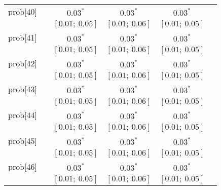 \begin{table}
\begin{center}
\begin{tabular}{l c c c c c }
prob[40]    &                                  & $0.03^{*}$                & $0.03^{*}$                & $0.03^{*}$              &                         \\
            &                                  & $[0.01;\ 0.05]$           & $[0.01;\ 0.06]$           & $[0.01;\ 0.05]$         &                         \\
prob[41]    &                                  & $0.03^{*}$                & $0.03^{*}$                & $0.03^{*}$              &                         \\
            &                                  & $[0.01;\ 0.05]$           & $[0.01;\ 0.06]$           & $[0.01;\ 0.05]$         &                         \\
prob[42]    &                                  & $0.03^{*}$                & $0.03^{*}$                & $0.03^{*}$              &                         \\
            &                                  & $[0.01;\ 0.05]$           & $[0.01;\ 0.06]$           & $[0.01;\ 0.05]$         &                         \\
prob[43]    &                                  & $0.03^{*}$                & $0.03^{*}$                & $0.03^{*}$              &                         \\
            &                                  & $[0.01;\ 0.05]$           & $[0.01;\ 0.06]$           & $[0.01;\ 0.05]$         &                         \\
prob[44]    &                                  & $0.03^{*}$                & $0.03^{*}$                & $0.03^{*}$              &                         \\
            &                                  & $[0.01;\ 0.05]$           & $[0.01;\ 0.06]$           & $[0.01;\ 0.05]$         &                         \\
prob[45]    &                                  & $0.03^{*}$                & $0.03^{*}$                & $0.03^{*}$              &                         \\
            &                                  & $[0.01;\ 0.05]$           & $[0.01;\ 0.06]$           & $[0.01;\ 0.05]$         &                         \\
prob[46]    &                                  & $0.03^{*}$                & $0.03^{*}$                & $0.03^{*}$              &                         \\
            &                                  & $[0.01;\ 0.05]$           & $[0.01;\ 0.06]$           & $[0.01;\ 0.05]$         &                         \\

\end{tabular}
\end{center}
\end{table}
